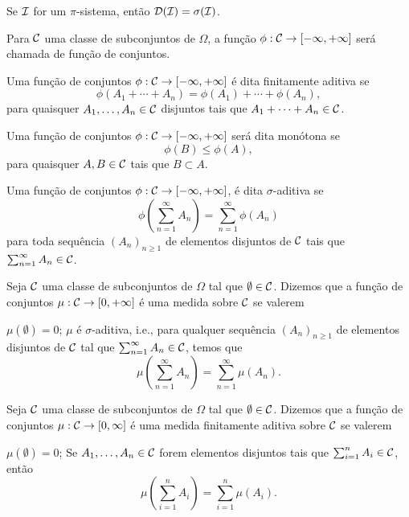 \begin{theorem}
	Se $\mathcal{I}$ for um $\pi$-sistema, então $\mathcal{D}(\mathcal{I}) = \sigma(\mathcal{I})$.
\end{theorem}

\begin{definition}
	Para $\mathcal{C}$ uma classe de subconjuntos de $\Omega$, a função $\phi : \mathcal{C} \to [-\infty, +\infty]$ será chamada de função de conjuntos.
\end{definition}

\begin{definition}
	Uma função de conjuntos $\phi : \mathcal{C} \to [-\infty, +\infty]$ é dita finitamente aditiva se
	\[
	\phi(A_1 + \cdots + A_n) = \phi(A_1) + \cdots + \phi(A_n),
	\]
	para quaisquer $A_1, \ldots, A_n \in \mathcal{C}$ disjuntos tais que $A_1 + \cdots + A_n \in \mathcal{C}$.
\end{definition}

\begin{definition}[Monótona]
	Uma função de conjuntos $\phi : \mathcal{C} \to [-\infty, +\infty]$ será dita monótona se
	\[
	\phi(B) \leq \phi(A),
	\]
	para quaisquer $A, B \in \mathcal{C}$ tais que $B \subset A$.
\end{definition}

\begin{definition}
	Uma função de conjuntos $\phi : \mathcal{C} \to [-\infty, +\infty]$, é dita $\sigma$-aditiva se
	\[
	\phi\left( \sum_{n=1}^{\infty} A_n \right) = \sum_{n=1}^{\infty} \phi(A_n)
	\]
	para toda sequência $(A_n)_{n\geq 1}$ de elementos disjuntos de $\mathcal{C}$ tais que $\sum_{n=1}^{\infty} A_n \in \mathcal{C}$.
\end{definition}

\begin{definition}[Medida]
	Seja $\mathcal{C}$ uma classe de subconjuntos de $\Omega$ tal que $\emptyset \in \mathcal{C}$. Dizemos que a função de conjuntos $\mu : \mathcal{C} \to [0, +\infty]$ é uma medida sobre $\mathcal{C}$ se valerem
	\begin{outline}[enumerate]
		\1 $\mu(\emptyset) = 0$;
		\1 $\mu$ é $\sigma$-aditiva, i.e., para qualquer sequência $(A_n)_{n\geq 1}$ de elementos disjuntos de $\mathcal{C}$ tal que $\sum_{n=1}^{\infty} A_n \in \mathcal{C}$, temos que
		\[
		\mu\left( \sum_{n=1}^{\infty} A_n \right) = \sum_{n=1}^{\infty} \mu(A_n).
		\]
	\end{outline}
\end{definition}

\begin{definition}
	Seja $\mathcal{C}$ uma classe de subconjuntos de $\Omega$ tal que $\emptyset \in \mathcal{C}$. Dizemos que a função de conjuntos $\mu : \mathcal{C} \to [0,\infty]$ é uma medida finitamente aditiva sobre $\mathcal{C}$ se valerem
	\begin{outline}[enumerate]
		\1 $\mu(\emptyset) = 0$;
		\1 Se $A_1, \ldots, A_n \in \mathcal{C}$ forem elementos disjuntos tais que $\sum_{i=1}^{n} A_i \in \mathcal{C}$, então
		\[
		\mu\left( \sum_{i=1}^{n} A_i \right) = \sum_{i=1}^{n} \mu(A_i).
		\]
	\end{outline}
\end{definition}

